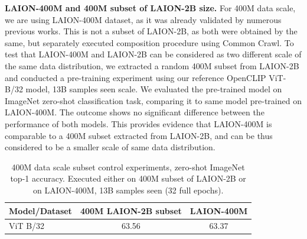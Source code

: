 \begin{appendix}


\textbf{LAION-400M and 400M subset of LAION-2B size.} For 400M data scale, we are using LAION-400M dataset, as it was already validated by numerous previous works. This is not a subset of LAION-2B, as both were obtained by the same, but separately executed composition procedure using Common Crawl. To test that LAION-400M and LAION-2B can be considered as two different scale of the same data distribution, we extracted a random 400M subset from LAION-2B and conducted a pre-training experiment using our reference OpenCLIP ViT-B/32 model, 13B samples seen scale. We evaluated the pre-trained model on ImageNet zero-shot classification task, comparing it to same model pre-trained on LAION-400M. The outcome shows no significant difference between the performance of both models. This provides evidence that LAION-400M is comparable to a 400M subset extracted from LAION-2B, and can be thus considered to be a smaller scale of same data distribution.

\begin{table}[!htb]
\setlength\tabcolsep{4.0pt}
    \centering
    \small
    \begin{tabular}{lcc}\toprule
    Model/Dataset & 400M LAION-2B subset &  LAION-400M \\ \midrule
    ViT B/32 & 63.56 & 63.37 \\\bottomrule
    \end{tabular}
    \caption{
    400M data scale subset control experiments, zero-shot ImageNet top-1 accuracy. Executed either on 400M subset of LAION-2B or on LAION-400M, 13B samples seen (32 full epochs).
    \vspace{-1em}
    }
    \label{tab:subset_400M}
\end{table}


\end{appendix}
